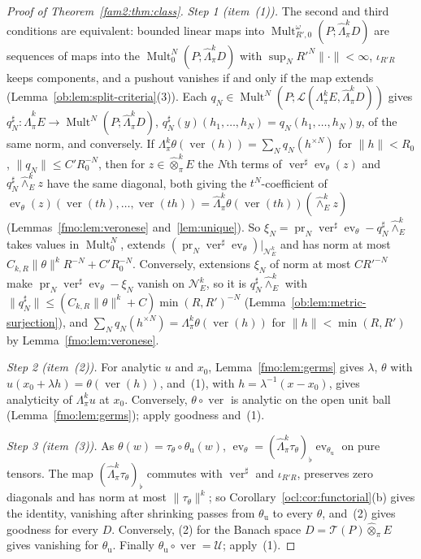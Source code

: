 \documentclass[11pt]{amsart}
\theoremstyle{definition}
\theoremstyle{remark}
\numberwithin{equation}{section}
\newcommand{\cL}{\mathcal L}
\newcommand{\Mult}{\operatorname{Mult}}
\newcommand{\norm}[1]{\lVert #1\rVert}
\theoremstyle{plain}
\theoremstyle{definition}
\theoremstyle{plain}
\newcommand{\ev}{\operatorname{ev}}
\newcommand{\hot}{\mathbin{\widehat\otimes}}
\newcommand{\hLambda}{\widehat\Lambda}
\newcommand{\cN}{\mathcal N}
\begin{document}
\begin{proof}[Proof of Theorem~\ref{fam2:thm:class}]
\emph{Step 1 (item~(1)).} The second and third conditions are equivalent: bounded linear maps into
$\Mult^\omega_{R',0}(P;\hLambda^k_\pi D)$ are sequences of maps into the $\Mult^N_0(P;\hLambda^k_\pi D)$ with
$\sup_NR'^N\norm\cdot<\infty$, $\iota_{R'R}$ keeps components, and a pushout vanishes if and only if the map extends
(Lemma~\ref{ob:lem:split-criteria}(3)). Each $q_N\in\Mult^N(P;\cL(\Lambda^k_\pi E,\hLambda^k_\pi D))$ gives
$q_N^\sharp\colon\hLambda^k_\pi E\to\Mult^N(P;\hLambda^k_\pi D)$, $q_N^\sharp(y)(h_1,\dots,h_N)=q_N(h_1,\dots,h_N)y$, of the
same norm, and conversely. If $\Lambda^k_\pi\theta(\operatorname{ver}(h))=\sum_Nq_N(h^{\times N})$ for $\norm h<R_0$,
$\norm{q_N}\le C'R_0^{-N}$, then for $z\in\hot^k_\pi E$ the $N$th terms of $\operatorname{ver}^\sharp\ev_\theta(z)$ and
$q_N^\sharp\widehat\wedge^k_Ez$ have the same diagonal, both giving the $t^N$-coefficient of
$\ev_\theta(z)(\operatorname{ver}(th),\dots,\operatorname{ver}(th))=\hLambda^k_\pi\theta(\operatorname{ver}(th))
(\widehat\wedge^k_Ez)$ (Lemmas~\ref{fmo:lem:veronese} and~\ref{lem:unique}). So
$\xi_N=\operatorname{pr}_N\operatorname{ver}^\sharp\ev_\theta-q_N^\sharp\widehat\wedge^k_E$ takes values in
$\Mult^N_0$, extends $(\operatorname{pr}_N\operatorname{ver}^\sharp
\ev_\theta)|_{\cN^k_E}$ and has norm at most $C_{k,R}\norm\theta^kR^{-N}+C'R_0^{-N}$. Conversely, extensions $\xi_N$ of norm
at most $CR'^{-N}$ make $\operatorname{pr}_N\operatorname{ver}^\sharp\ev_\theta-\xi_N$ vanish on $\cN^k_E$, so it is
$q_N^\sharp\widehat\wedge^k_E$ with $\norm{q_N^\sharp}\le(C_{k,R}\norm\theta^k+C)\min(R,R')^{-N}$
(Lemma~\ref{ob:lem:metric-surjection}), and $\sum_Nq_N(h^{\times N})=\Lambda^k_\pi\theta(\operatorname{ver}(h))$ for
$\norm h<\min(R,R')$ by Lemma~\ref{fmo:lem:veronese}.

\emph{Step 2 (item~(2)).} For analytic $u$ and $x_0$, Lemma~\ref{fmo:lem:germs} gives $\lambda$, $\theta$ with
$u(x_0+\lambda h)=\theta(\operatorname{ver}(h))$, and~(1), with $h=\lambda^{-1}(x-x_0)$, gives analyticity of
$\Lambda^k_\pi u$ at $x_0$. Conversely, $\theta\circ\operatorname{ver}$ is analytic on the open unit ball
(Lemma~\ref{fmo:lem:germs}); apply goodness and~(1).

\emph{Step 3 (item~(3)).} As $\theta(w)=\tau_\theta\circ\theta_{\mathrm u}(w)$, $\ev_\theta=(\hLambda^k_\pi\tau_\theta)_\flat
\ev_{\theta_{\mathrm u}}$ on pure tensors. The map $(\hLambda^k_\pi\tau_\theta)_\flat$ commutes with
$\operatorname{ver}^\sharp$ and $\iota_{R'R}$, preserves zero diagonals and has norm at most $\norm{\tau_\theta}^k$; so
Corollary~\ref{ocl:cor:functorial}(b) gives the identity, vanishing after shrinking passes from $\theta_{\mathrm u}$ to every
$\theta$, and~(2) gives goodness for every $D$. Conversely, (2) for the Banach space $D=\mathcal T(P)\hot_\pi E$ gives
vanishing for $\theta_{\mathrm u}$. Finally $\theta_{\mathrm u}\circ\operatorname{ver}=\mathcal U$; apply~(1).
\end{proof}
\end{document}
